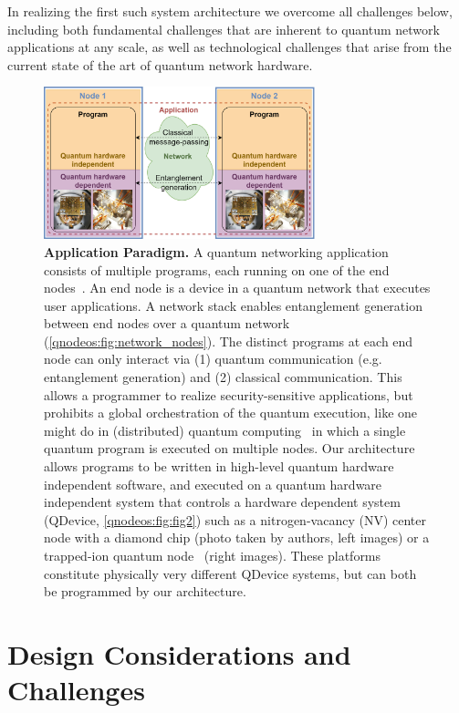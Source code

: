In realizing the first such system architecture we overcome all challenges below, including both fundamental challenges that are inherent to quantum network applications at any scale, as well as technological challenges that arise from the current state of the art of quantum network hardware.

\begin{figure}[t]
\centering
\includegraphics[width=0.7\textwidth]{figures/qnodeos/main/fig1/fig1.png}
\caption{\textbf{Application Paradigm.}
A quantum networking application consists of multiple programs, each running on one of the end nodes~\cite{dahlberg_2022_netqasm}.
An end node is a device in a quantum network that executes user applications.
A network stack enables entanglement generation between end nodes over a quantum network (\cref{qnodeos:fig:network_nodes}).
The distinct programs at each end node can only interact via (1) quantum communication (e.g. entanglement generation) and (2) classical communication.
This allows a programmer to realize security-sensitive applications, but prohibits a global orchestration of the quantum execution, like one might do in (distributed) quantum computing~\cite{caleffi_distributed_2022} in which a single quantum program is executed on multiple nodes.
Our architecture allows programs to be written in high-level quantum hardware independent software, and executed on a quantum hardware independent system  that controls a hardware dependent system (QDevice, \cref{qnodeos:fig:fig2}) such as a nitrogen-vacancy (NV) center node with a diamond chip (photo taken by authors, left images) or a trapped-ion quantum node~\cite{teller2023integrating} (right images).
These platforms constitute physically very different QDevice systems, but can both be programmed by our architecture.}
\label{qnodeos:fig:fig1}
\end{figure}




\section{Design Considerations and Challenges}
